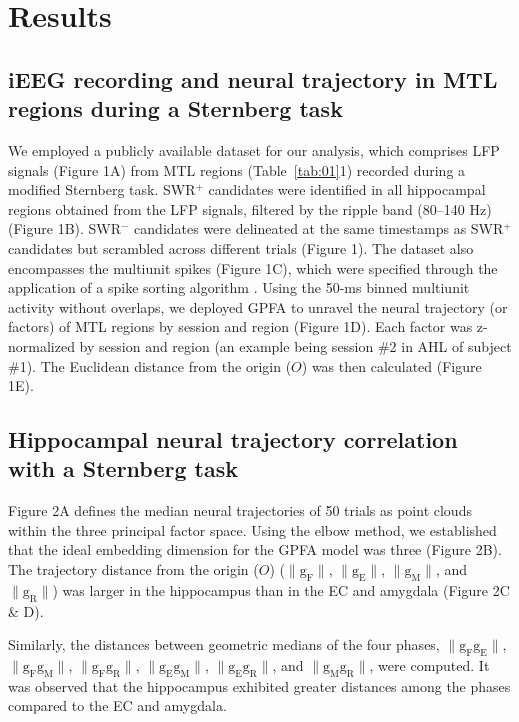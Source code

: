 \section{Results}
\subsection{iEEG recording and neural trajectory in MTL regions during a Sternberg task}
We employed a publicly available dataset \cite{boran_dataset_2020} for our analysis, which comprises LFP signals (Figure 1A) from MTL regions (Table~\ref{tab:01}1) recorded during a modified Sternberg task. SWR$^+$ candidates were identified in all hippocampal regions obtained from the LFP signals, filtered by the ripple band (80--140 Hz) (Figure 1B). SWR$^-$ candidates were delineated at the same timestamps as SWR$^+$ candidates but scrambled across different trials (Figure 1). The dataset also encompasses the multiunit spikes (Figure 1C), which were specified through the application of a spike sorting algorithm \cite{niediek_reliable_2016}. Using the 50-ms binned multiunit activity without overlaps, we deployed GPFA \cite{yu_gaussian-process_2009} to unravel the neural trajectory (or factors) of MTL regions by session and region (Figure 1D). Each factor was z-normalized by session and region (an example being session \#2 in AHL of subject \#1). The Euclidean distance from the origin ($O$) was then calculated (Figure 1E).

\subsection{Hippocampal neural trajectory correlation with a Sternberg task}
Figure 2A defines the median neural trajectories of 50 trials as point clouds within the three principal factor space. Using the elbow method, we established that the ideal embedding dimension for the GPFA model was three (Figure 2B). The trajectory distance from the origin ($O$) ($\mathrm{\lVert g_{F} \rVert}$, $\mathrm{\lVert g_{E} \rVert}$, $\mathrm{\lVert g_{M} \rVert}$, and $\mathrm{\lVert g_{R} \rVert}$) was larger in the hippocampus than in the EC and amygdala (Figure 2C \& D).

Similarly, the distances between geometric medians of the four phases, $\mathrm{\lVert g_{F}g_{E} \rVert}$, $\mathrm{\lVert g_{F}g_{M} \rVert}$, $\mathrm{\lVert g_{F}g_{R} \rVert}$, $\mathrm{\lVert g_{E}g_{M} \rVert}$, $\mathrm{\lVert g_{E}g_{R} \rVert}$, and $\mathrm{\lVert g_{M}g_{R} \rVert}$, were computed. It was observed that the hippocampus exhibited greater distances among the phases compared to the EC and amygdala. 


